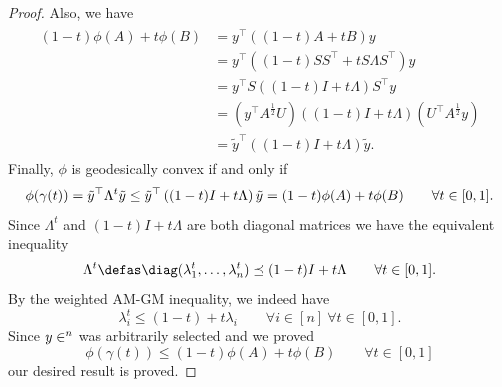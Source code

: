 \documentclass[twoside,11pt]{article}
\begin{document}
\begin{proof}
Also, we have
\begin{align*}
    \begin{split}
        (1-t)\phi(A) + t \phi(B) & = y^\top \left((1-t)A + t B\right) y 
        \\ &= y^\top \left( (1-t)S S^\top + t S \Lambda S^\top \right)y 
        \\&= y^\top S \left((1-t)I + t \Lambda  \right)S^\top y
        \\&= \left(y^\top A^{\frac{1}{2}}U \right)\left((1-t)I + t \Lambda  \right) \left(U^\top A^{\frac{1}{2}}y \right)
        \\&= \tilde{y}^\top \left((1-t)I + t \Lambda\right) \tilde{y}.
    \end{split}
\end{align*}
Finally, $\phi$ is geodesically convex if and only if 
\[
\phi(\gamma(t)) = \Tilde{y}^\top \Lambda^t \Tilde{y} \leq \tilde{y}^\top \left((1-t)I + t \Lambda\right) \tilde{y} = (1-t)\phi(A) + t \phi(B) \qquad \forall t \in [0,1].
\]
Since $\Lambda^t$ and $(1-t)I + t \Lambda$ are both diagonal matrices we have the equivalent inequality
\[
\Lambda^t \defas \diag(\lambda_1^t, \ldots, \lambda_n^t) \preceq (1-t)I + t \Lambda \qquad \forall t \in [0,1].
\]
By the weighted AM-GM inequality, we indeed have 
\[
\lambda_i^t \leq (1-t) + t \lambda_i \qquad \forall i \in [n] \ \forall t \in [0,1]. 
\]
Since $y \in \real^n$ was arbitrarily selected and we proved 
\[
\phi(\gamma(t)) \leq (1-t)\phi(A) + t \phi(B) \qquad \forall t \in [0,1]
\]
our desired result is proved.
\end{proof}
\[\]
\end{document}
